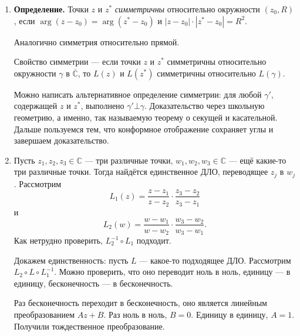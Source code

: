 \begin{enumerate}
    \item \textbf{Определение.} Точки $z$ и $z^*$ \textit{симметричны} относительно окружности $(z_0, R)$, если $\arg(z - z_0) = \arg(z^* - z_0)$ и $|z - z_0| \cdot |z^* - z_0| = R^2$.

        Аналогично симметрия относительно прямой.

        Свойство симметрии --- если точки $z$ и $z^*$ симметричны относительно окружности $\gamma$ в $\overline{\mathbb C}$, то $L(z)$ и $L(z^*)$ симметричны относительно $L(\gamma)$.

        Можно написать альтернативное определение симметрии: для любой $\gamma'$, содержащей $z$ и $z^*$, выполнено $\gamma' \bot \gamma$.
        Доказательство через школьную геометрию, а именно, так называемую теорему о секущей и касательной.
        Дальше пользуемся тем, что конформное отображение сохраняет углы и завершаем доказательство.

    \item Пусть $z_1, z_2, z_3 \in \mathbb C$ --- три различные точки, $w_1, w_2, w_3 \in \mathbb C$ --- ещё какие-то три различные точки.
        Тогда найдётся единственное ДЛО, переводящее $z_j$ в $w_j$.
        Рассмотрим
        \[
            L_1(z) = \frac{z - z_1}{z - z_2} \cdot \frac{z_3 - z_2}{z_3 - z_1}
        \]
        и
        \[
            L_2(w) = \frac{w - w_1}{w - w_2} \cdot \frac{w_3 - w_2}{w_3 - w_1}.
        \]
        Как нетрудно проверить, $L_2^{-1} \circ L_1$ подходит.

        Докажем единственность: пусть $L$ --- какое-то подходящее ДЛО.
        Рассмотрим $L_2 \circ L \circ L_1^{-1}$.
        Можно проверить, что оно переводит ноль в ноль, единицу --- в единицу, бесконечность --- в бесконечность.

        Раз бесконечность переходит в бесконечность, оно является линейным преобразованием $Az + B$.
        Раз ноль в ноль, $B = 0$.
        Единицу в единицу, $A = 1$.
        Получили тождественное преобразование.
\end{enumerate}

